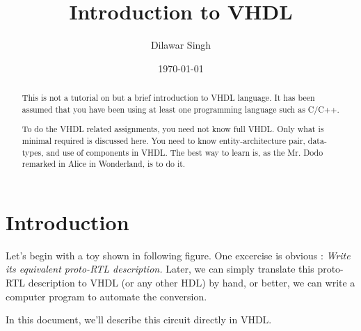 \documentclass[a4paper,10pt]{article}
\title{Introduction to VHDL}
\author{Dilawar Singh}
\date{\today}
\begin{document}
\maketitle

\begin{abstract}
  
  This is not a tutorial on but a brief introduction to VHDL language. It has
  been assumed that you have been using at least one programming language such
  as C/C++. 
  
  To do the VHDL related assignments, you need not know full VHDL.  Only what is 
  minimal required is discussed here. You need to know entity-architecture
  pair, data-types, and use of components in VHDL. The best way to learn is, as
  the Mr. Dodo remarked in Alice in Wonderland, is to do it. 

\end{abstract}

\section{Introduction}
  
 Let's begin with a toy shown in following figure. One excercise is obvious :
 \emph{Write its equivalent proto-RTL description.} Later, we can simply
 translate this proto-RTL description to VHDL (or any other HDL) by hand, or
 better, we can write a computer program to automate the conversion.

 In this document, we'll describe this circuit directly in VHDL.
 
\end{document}
